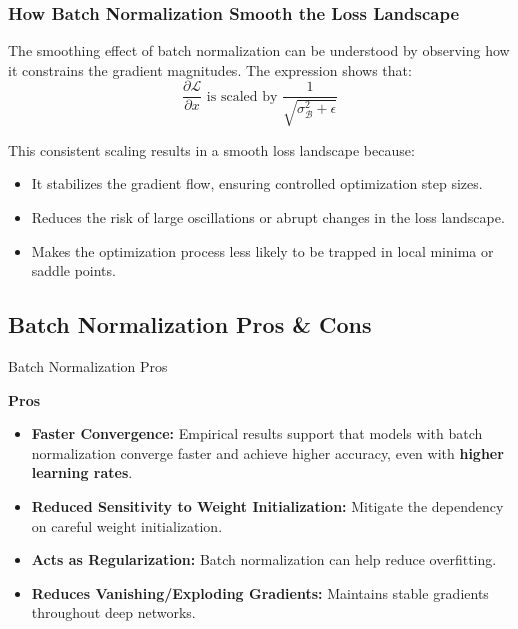 \documentclass[serif, aspectratio=169]{beamer}
\begin{document}
\begin{frame}
    \frametitle{How Batch Normalization Smooth the  Loss Landscape}

    The smoothing effect of batch normalization can be understood by observing how it constrains the gradient magnitudes. The expression shows that:
    \begin{equation}
        \frac{\partial \mathcal{L}}{\partial x} \text{ is scaled by } \frac{1}{\sqrt{\sigma_{\mathcal{B}}^2 + \epsilon}}
    \end{equation}

    This consistent scaling results in a smooth loss landscape because:
    \begin{itemize}
        \item It stabilizes the gradient flow, ensuring controlled optimization step sizes.
        \item Reduces the risk of large oscillations or abrupt changes in the loss landscape.
        \item Makes the optimization process less likely to be trapped in local minima or saddle points.
    \end{itemize}
\end{frame}


\subsection{Batch Normalization Pros \& Cons}

\begin{frame}{Batch Normalization Pros}

    \textbf{Pros}
    
    \begin{itemize}

        \item \textbf{Faster Convergence:}  Empirical results support that models with batch normalization converge faster and achieve higher accuracy, even with \textbf{higher learning rates}.
        \item \textbf{Reduced Sensitivity to  Weight Initialization:} Mitigate the dependency on careful weight initialization.
        \item \textbf{Acts as Regularization:} Batch normalization can help reduce overfitting.
        \item \textbf{Reduces Vanishing/Exploding Gradients:} Maintains stable gradients throughout deep networks.


    \end{itemize}
\end{frame}
\end{document}
